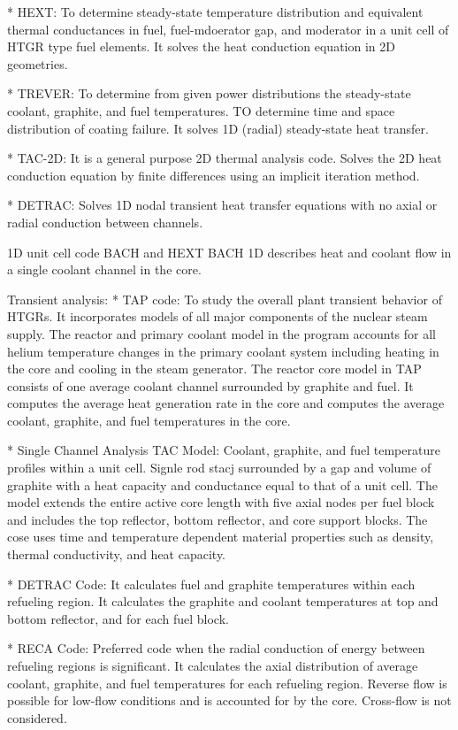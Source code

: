 * HEXT:
To determine steady-state temperature distribution and equivalent thermal conductances in fuel, fuel-mdoerator gap, and moderator in a unit cell of HTGR type fuel elements.
It solves the heat conduction equation in 2D geometries.

* TREVER:
To determine from given power distributions the steady-state coolant, graphite, and fuel temperatures.
TO determine time and space distribution of coating failure.
It solves 1D (radial) steady-state heat transfer.

* TAC-2D:
It is a general purpose 2D thermal analysis code.
Solves the 2D heat conduction equation by finite differences using an implicit iteration method.

* DETRAC:
Solves 1D nodal transient heat transfer equations with no axial or radial conduction between channels.

1D unit cell code BACH and HEXT
BACH 1D describes heat and coolant flow in a single coolant channel in the core.

Transient analysis:
* TAP code:
To study the overall plant transient behavior of HTGRs.
It incorporates models of all major components of the nuclear steam supply.
The reactor and primary coolant model in the program accounts for all helium temperature changes in the primary coolant system including heating in the core and cooling in the steam generator.
The reactor core model in TAP consists of one average coolant channel surrounded by graphite and fuel.
It computes the average heat generation rate in the core and computes the average coolant, graphite, and fuel temperatures in the core.

* Single Channel Analysis TAC Model:
Coolant, graphite, and fuel temperature profiles within a unit cell.
Signle rod stacj surrounded by a gap and volume of graphite with a heat capacity and conductance equal to that of a unit cell.
The model extends the entire active core length with five axial nodes per fuel block and includes the top reflector, bottom reflector, and core support blocks.
The cose uses time and temperature dependent material properties such as density, thermal conductivity, and heat capacity.

* DETRAC Code:
It calculates fuel and graphite temperatures within each refueling region.
It calculates the graphite and coolant temperatures at top and bottom reflector, and for each fuel block.

* RECA Code:
Preferred code when the radial conduction of energy between refueling regions is significant.
It calculates the axial distribution of average coolant, graphite, and fuel temperatures for each refueling region.
Reverse flow is possible for low-flow conditions and is accounted for by the core.
Cross-flow is not considered.

